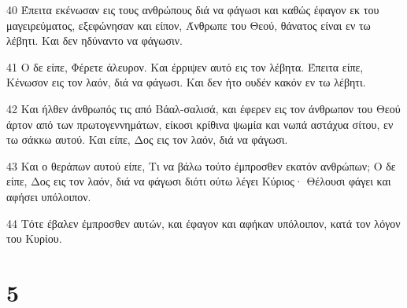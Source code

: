 \par 40 Έπειτα εκένωσαν εις τους ανθρώπους διά να φάγωσι και καθώς έφαγον εκ του μαγειρεύματος, εξεφώνησαν και είπον, Άνθρωπε του Θεού, θάνατος είναι εν τω λέβητι. Και δεν ηδύναντο να φάγωσιν.
\par 41 Ο δε είπε, Φέρετε άλευρον. Και έρριψεν αυτό εις τον λέβητα. Έπειτα είπε, Κένωσον εις τον λαόν, διά να φάγωσι. Και δεν ήτο ουδέν κακόν εν τω λέβητι.
\par 42 Και ήλθεν άνθρωπός τις από Βάαλ-σαλισά, και έφερεν εις τον άνθρωπον του Θεού άρτον από των πρωτογεννημάτων, είκοσι κρίθινα ψωμία και νωπά αστάχυα σίτου, εν τω σάκκω αυτού. Και είπε, Δος εις τον λαόν, διά να φάγωσι.
\par 43 Και ο θεράπων αυτού είπε, Τι να βάλω τούτο έμπροσθεν εκατόν ανθρώπων; Ο δε είπε, Δος εις τον λαόν, διά να φάγωσι διότι ούτω λέγει Κύριος· Θέλουσι φάγει και αφήσει υπόλοιπον.
\par 44 Τότε έβαλεν έμπροσθεν αυτών, και έφαγον και αφήκαν υπόλοιπον, κατά τον λόγον του Κυρίου.

\chapter{5}

